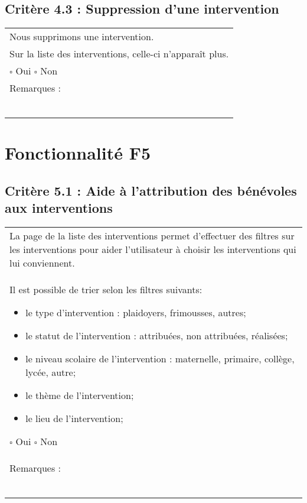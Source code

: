   		
  	\subsection*{Critère 4.3 : Suppression d'une intervention}
  		\begin{center}
    	 		\begin{tabular}[h]{|p{}|}
			\hline
				Nous supprimons une intervention. \\
				Sur la liste des interventions, celle-ci n'apparaît plus. \\
				
				$\square$ Oui  \hfill \hfill $\square$ Non \\\hline Remarques : \\ ~\\
			 \\\hline
     		\end{tabular}
  		\end{center}	

\section{Fonctionnalité F5}
	\subsection*{Critère 5.1 : Aide à l'attribution des bénévoles aux interventions }
  		\begin{center}
    	 		\begin{tabular}[h]{|p{}|}
			\hline
				La page de la liste des interventions permet d'effectuer des filtres sur les interventions pour aider l'utilisateur à choisir les interventions qui lui conviennent.\\
				Il est possible de trier selon les filtres suivants: 
				\begin{itemize}
				\item le type d'intervention : plaidoyers, frimousses, autres;
				\item le statut de l'intervention : attribuées, non attribuées, réalisées;
				\item le niveau scolaire de l'intervention : maternelle, primaire, collège, lycée, autre;
				\item le thème de l'intervention;
				\item le lieu de l'intervention; 
				\end{itemize}
				
				$\square$ Oui  \hfill \hfill $\square$ Non \\\hline Remarques : \\ ~\\
			 \\\hline
     		\end{tabular}
  		\end{center}	
  		
